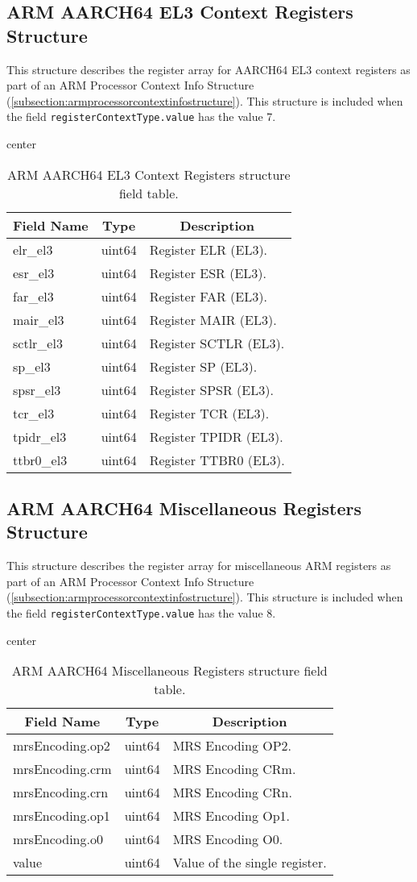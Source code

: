\documentclass{report}
\newcommand*{\thead}[1]{\multicolumn{1}{|c|}{\bfseries #1}}
\newcommand*{\jsontable}[1]{
    \begin{table}[!ht]
    \label{#1}
    \centering
    \begin{adjustbox}{center}
    \begin{tabular}{|l|c|p{8cm}|}
    \hline
    \thead{Field Name} & \thead{Type} & \thead{Description} \\
    \hline
}
\newcommand*{\jsontableend}[1]{
    \hline
    \end{tabular}
    \end{adjustbox}
    \caption{#1}
    \label{table:#1}
    \end{table}
    \FloatBarrier
}
\begin{document}
\subsection{ARM AARCH64 EL3 Context Registers Structure}
\label{subsection:armaarch64el3contextregistersstructure}
This structure describes the register array for AARCH64 EL3 context registers as part of an ARM Processor Context Info Structure (\ref{subsection:armprocessorcontextinfostructure}). This structure is included when the field \texttt{registerContextType.value} has the value 7.
\jsontable{table:armaarch64el3contextregistersstructure}
elr\_el3 & uint64 & Register ELR (EL3).\\
\hline
esr\_el3 & uint64 & Register ESR (EL3).\\
\hline
far\_el3 & uint64 & Register FAR (EL3).\\
\hline
mair\_el3 & uint64 & Register MAIR (EL3).\\
\hline
sctlr\_el3 & uint64 & Register SCTLR (EL3).\\
\hline
sp\_el3 & uint64 & Register SP (EL3).\\
\hline
spsr\_el3 & uint64 & Register SPSR (EL3).\\
\hline
tcr\_el3 & uint64 & Register TCR (EL3).\\
\hline
tpidr\_el3 & uint64 & Register TPIDR (EL3).\\
\hline
ttbr0\_el3 & uint64 & Register TTBR0 (EL3).\\
\jsontableend{ARM AARCH64 EL3 Context Registers structure field table.}

\subsection{ARM AARCH64 Miscellaneous Registers Structure}
\label{subsection:armmiscregistersstructure}
This structure describes the register array for miscellaneous ARM registers as part of an ARM Processor Context Info Structure (\ref{subsection:armprocessorcontextinfostructure}). This structure is included when the field \texttt{registerContextType.value} has the value 8.
\jsontable{table:armmiscregistersstructure}
mrsEncoding.op2 & uint64 & MRS Encoding OP2.\\
\hline
mrsEncoding.crm & uint64 & MRS Encoding CRm.\\
\hline
mrsEncoding.crn & uint64 & MRS Encoding CRn.\\
\hline
mrsEncoding.op1 & uint64 & MRS Encoding Op1.\\
\hline
mrsEncoding.o0 & uint64 & MRS Encoding O0.\\
\hline
value & uint64 & Value of the single register.\\
\jsontableend{ARM AARCH64 Miscellaneous Registers structure field table.}
\end{document}
